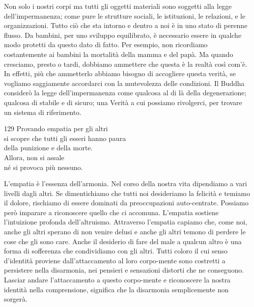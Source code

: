 \begin{dhpRefl}
  Non solo i nostri corpi ma tutti gli oggetti materiali sono soggetti alla
  legge dell'impermanenza; come pure le strutture sociali, le istituzioni, le
  relazioni, e le organizzazioni. Tutto ciò che sta intorno e dentro a noi è in
  uno stato di perenne flusso. Da bambini, per uno sviluppo equilibrato, è
  necessario essere in qualche modo protetti da questo dato di fatto. Per
  esempio, non ricordiamo costantemente ai bambini la mortalità della mamma e
  del papà. Ma quando cresciamo, presto o tardi, dobbiamo ammettere che questa è
  la realtà così com'è. In effetti, più che ammetterlo abbiamo bisogno di
  accogliere questa verità, se vogliamo saggiamente accordarci con la
  mutevolezza delle condizioni. Il Buddha considerò la legge dell'impermanenza
  come qualcosa al di là della degenerazione; qualcosa di stabile e di sicuro;
  una Verità a cui possiamo rivolgerci, per trovare un sistema di riferimento.
\end{dhpRefl}


\begin{dhpVerse}{129}
\label{dhp-129}
Provando empatia per gli altri\\
si scopre che tutti gli esseri hanno paura\\
della punizione e della morte.\\
Allora, non si assale\\
né si provoca più nessuno.
\end{dhpVerse}

\begin{dhpRefl}
  L'empatia è l'essenza dell'armonia. Nel corso della nostra vita dipendiamo a
  vari livelli dagli altri. Se dimentichiamo che tutti noi desideriamo la
  felicità e temiamo il dolore, rischiamo di essere dominati da preoccupazioni
  auto-centrate. Possiamo però imparare a riconoscere quello che ci accomuna.
  L'empatia sostiene l'intuizione profonda dell'altruismo. Attraverso l'empatia
  capiamo che, come noi, anche gli altri sperano di non venire delusi e anche
  gli altri temono di perdere le cose che gli sono care. Anche il desiderio di
  fare del male a qualcun altro è una forma di sofferenza che condividiamo con
  gli altri. Tutti coloro il cui senso d'identità proviene dall'attaccamento al
  loro corpo-mente sono costretti a persistere nella disarmonia, nei pensieri e
  sensazioni distorti che ne conseguono. Lasciar andare l'attaccamento a questo
  corpo-mente e riconoscere la nostra identità nella comprensione, significa che
  la disarmonia semplicemente non sorgerà.
\end{dhpRefl}

